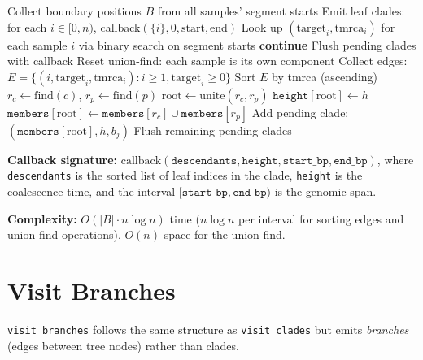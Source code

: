 \documentclass[11pt]{article}
\begin{document}
\begin{algorithm}[h]
\caption{\texttt{visit\_clades}: Enumerate all clades in the ARG}
\begin{algorithmic}[1]
\State Collect boundary positions $B$ from all samples' segment starts
\State Emit leaf clades: for each $i \in [0, n)$, callback$(\{i\}, 0, \text{start}, \text{end})$
\For{each interval $[b_j, b_{j+1})$}
    \State Look up $(\text{target}_i, \text{tmrca}_i)$ for each sample $i$ via binary search on segment starts
        \State \textbf{continue} 
    \EndIf
    \State Flush pending clades with callback
    \State Reset union-find: each sample is its own component
    \State Collect edges: $E = \{(i, \text{target}_i, \text{tmrca}_i) : i \ge 1, \text{target}_i \ge 0\}$
    \State Sort $E$ by tmrca (ascending)
        \State $r_c \gets \text{find}(c)$, $r_p \gets \text{find}(p)$
            \State $\text{root} \gets \text{unite}(r_c, r_p)$
            \State $\texttt{height}[\text{root}] \gets h$
            \State $\texttt{members}[\text{root}] \gets \texttt{members}[r_c] \cup \texttt{members}[r_p]$
            \State Add pending clade: $(\texttt{members}[\text{root}], h, b_j)$
        \EndIf
    \EndFor
\EndFor
\State Flush remaining pending clades
\end{algorithmic}
\end{algorithm}

\textbf{Callback signature:}
$\text{callback}(\texttt{descendants}, \texttt{height},
\texttt{start\_bp}, \texttt{end\_bp})$, where \texttt{descendants} is the
sorted list of leaf indices in the clade, \texttt{height} is the
coalescence time, and the interval $[\texttt{start\_bp},
\texttt{end\_bp})$ is the genomic span.

\textbf{Complexity:}  $O(|B| \cdot n \log n)$ time ($n \log n$ per interval
for sorting edges and union-find operations), $O(n)$ space for the
union-find.

\section{Visit Branches}

\texttt{visit\_branches} follows the same structure as
\texttt{visit\_clades} but emits \emph{branches} (edges between tree nodes)
rather than clades.
\end{document}
